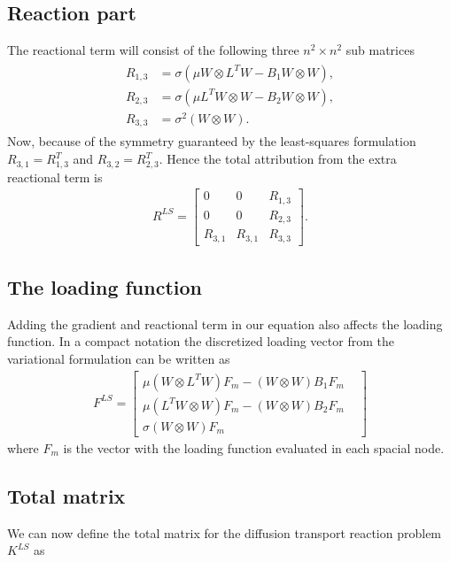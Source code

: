 \subsection{Reaction part}
The reactional term will consist of the following three $n^2 \times n^2$ sub matrices
\begin{align}
	\begin{split}
	R_{1,3} &= \sigma(\mu W\otimes L^T W - B_1 W\otimes W),\\
	R_{2,3} &= \sigma(\mu L^T W\otimes W - B_2 W\otimes W),\\
	R_{3,3} &= \sigma^2(W\otimes W).
	\end{split}
	\label{ReactionalTerm}
\end{align}
Now, because of the symmetry guaranteed by the least-squares formulation $R_{3,1}=R_{1,3}^T$ and $R_{3,2}=R_{2,3}^T$. Hence the total attribution from the extra reactional term is 
%
\begin{align}
R^{LS}=
\begin{bmatrix}
	0 & 0	 &	R_{1,3}   \\
	0 & 0	 &	R_{2,3}   \\
	R_{3,1} & R_{3,1} & R_{3,3} 
\end{bmatrix}.
	\label{eq:ReactionMatrix}
\end{align}
%
\subsection{The loading function}
Adding the gradient and reactional term in our equation also affects the loading function. In a compact notation the discretized loading vector from the variational formulation can be written as
%
\begin{align}
	F^{LS}=
	\begin{bmatrix}
		\mu(W \otimes L^T W)F_m - (W \otimes W)B_1F_m \\
		\mu(L^TW \otimes W)F_m - (W \otimes W)B_2F_m \\
		\sigma(W\otimes W)F_m & 
	\end{bmatrix}
	\label{mat:FLS}
\end{align}
%
where $F_m$ is the vector with the loading function evaluated in each spacial node.
%

\subsection{Total matrix}
We can now define the total matrix for the diffusion transport reaction problem $K^{LS}$ as

